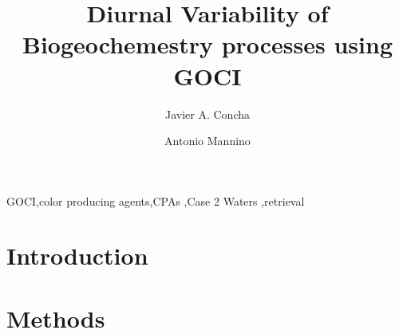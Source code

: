 \documentclass[onecolumn,3p,letterpaper,11pt,draft]{elsarticle}
\begin{document}
\linenumbers

\begin{frontmatter}

\title{Diurnal Variability of Biogeochemestry processes using GOCI}


\author[mymainaddress]{Javier A. Concha}

\author[mymainaddress]{Antonio Mannino}
\address[mymainaddress]{NASA Goddard Space Flight Center, MD 20771, USA}
\begin{abstract}


%


%
 

%

%

%


%
 
%


%

\end{abstract}

\begin{keyword}
GOCI\sep color producing agents\sep CPAs \sep Case 2 Waters \sep retrieval
\end{keyword}

\end{frontmatter}
\section{Introduction}


\section{Methods}
\end{document}
